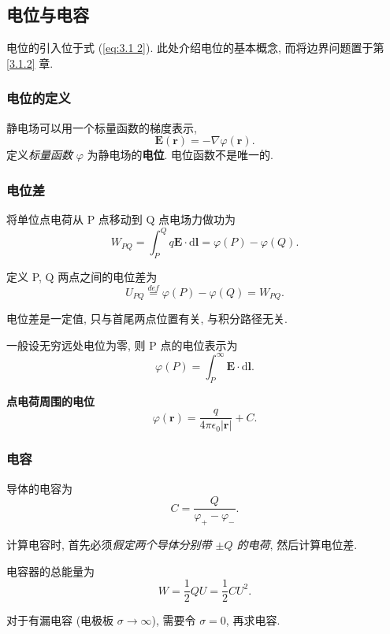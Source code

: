 \subsection{电位与电容}
电位的引入位于式 (\ref{eq:3.1 2}). 此处介绍电位的基本概念, 而将边界问题置于第 \ref{3.1.2} 章.

\subsubsection{电位的定义}
静电场可以用一个标量函数的梯度表示,
\begin{equation}
    \bm{E}(\bm{r})=-\nabla\varphi(\bm{r}).
\end{equation}
定义\textit{标量函数} $\varphi$ 为静电场的\textbf{电位}. 电位函数不是唯一的.

\subsubsection{电位差}
将单位点电荷从 P 点移动到 Q 点电场力做功为
\begin{equation}
    W_{PQ}=\int_{P}^{Q}q\bm{E}\cdot\mathrm{d}\bm{l}=\varphi(P)-\varphi(Q).
\end{equation}

定义 P, Q 两点之间的电位差为
\begin{equation}
    U_{PQ}\stackrel{def}{=}\varphi(P)-\varphi(Q)=W_{PQ}.
\end{equation}

电位差是一定值, 只与首尾两点位置有关, 与积分路径无关.

一般设无穷远处电位为零, 则 P 点的电位表示为
\begin{equation}
    \varphi(P)=\int_{P}^{\infty}\bm{E}\cdot\mathrm{d}\bm{l}.
\end{equation}

\textbf{点电荷周围的电位}
\begin{equation}
    \varphi(\bm{r})=\frac{q}{4\pi\epsilon_0|\bm{r}|}+C.
\end{equation}

\subsubsection{电容}
导体的电容为
\begin{equation}
    C=\frac{Q}{\varphi_+-\varphi_-}.
\end{equation}

计算电容时, 首先必须\textit{假定两个导体分别带 $\pm Q$ 的电荷}, 然后计算电位差.

电容器的总能量为
\begin{equation}
    W=\frac{1}{2}QU=\frac{1}{2}CU^2.
\end{equation}

对于有漏电容 (电极板 $\sigma\rightarrow\infty$), 需要令 $\sigma=0$, 再求电容.
